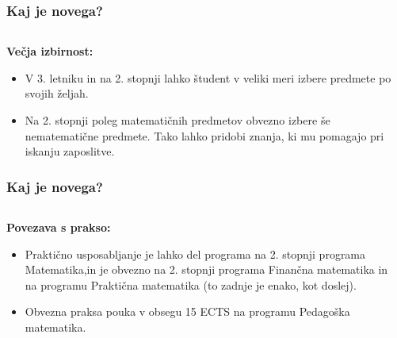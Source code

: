 \documentclass{beamer}
\begin{document}
\begin{frame}
\frametitle{Kaj je novega?}
\begin{columns}
\begin{column}{5.4cm}
\end{column}
\begin{column}{5.4cm}


\end{column}
\end{columns}

\vskip 0.45cm
{\bf \large{Ve\v cja izbirnost:}}
\begin{itemize}
\item V 3. letniku in na 2. stopnji lahko \v student
v veliki meri izbere predmete po svojih \v zeljah.\pause
\item Na 2. stopnji poleg matemati\v cnih predmetov obvezno izbere \v se nematemati\v cne predmete.\pause 
Tako lahko pridobi znanja, ki mu pomagajo pri iskanju zaposlitve.
\end{itemize}
\end{frame}

\begin{frame}\frametitle{Kaj je novega?}

\begin{columns}
\begin{column}{6.5cm}
{\bf \large{Povezava s prakso:}}

\begin{itemize}
\item Prakti\v cno usposabljanje je lahko del programa na 2. stopnji programa \alert{Matematika},\pause in je obvezno na 2. 
stopnji programa \alert{Finan\v cna matematika} in na programu \alert{Prakti\v cna matematika} (to zadnje je enako, kot doslej).\pause
\item Obvezna praksa pouka v obsegu 15 ECTS na programu \alert{Pedago\v ska matematika}.
\end{itemize}
\end{column}

\begin{column}{4.5cm}

\end{column}
\end{columns}
\end{frame}
\end{document}
